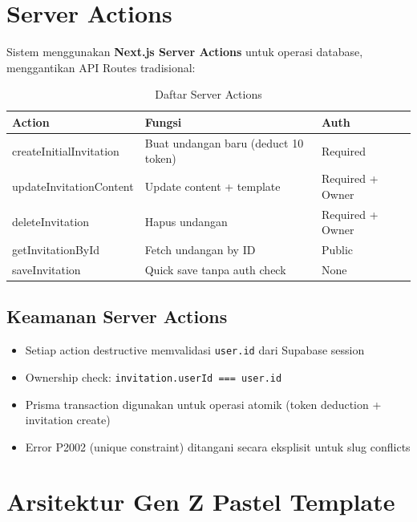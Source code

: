 \documentclass[12pt,a4paper]{article}
\begin{document}
\section{Server Actions}

Sistem menggunakan \textbf{Next.js Server Actions} untuk operasi database,
menggantikan API Routes tradisional:

\begin{table}[h]
\centering
\begin{tabular}{>{\ttfamily\footnotesize}l l l}
\toprule
\textrm{Action} & Fungsi & Auth \\
\midrule
createInitialInvitation & Buat undangan baru (deduct 10 token) & Required \\
updateInvitationContent & Update content + template            & Required + Owner \\
deleteInvitation        & Hapus undangan                       & Required + Owner \\
getInvitationById       & Fetch undangan by ID                 & Public \\
saveInvitation          & Quick save tanpa auth check          & None \\
\bottomrule
\end{tabular}
\caption{Daftar Server Actions}
\end{table}

\subsection{Keamanan Server Actions}

\begin{itemize}
  \item Setiap action destructive memvalidasi \texttt{user.id} dari Supabase session
  \item Ownership check: \texttt{invitation.userId === user.id}
  \item Prisma transaction digunakan untuk operasi atomik (token deduction + invitation create)
  \item Error P2002 (unique constraint) ditangani secara eksplisit untuk slug conflicts
\end{itemize}

\section{Arsitektur Gen Z Pastel Template}
\end{document}

